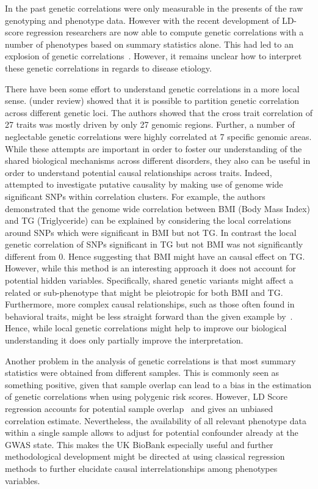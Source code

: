 In the past genetic correlations were only measurable in the presents of the raw genotyping and phenotype data.
However with the recent development of LD-score regression researchers are now able to compute genetic correlations with a number of phenotypes based on summary statistics alone.
This had led to an explosion of genetic correlations~\cite{Bulik-Sullivan2015b,Bulik-Sullivan2015a}.
However, it remains unclear how to interpret these genetic correlations in regards to disease etiology.

There have been some effort to understand genetic correlations in a more local sense.
\citet{Shi2016a} (under review) showed that it is possible to partition genetic correlation across different genetic loci.
The authors showed that the cross trait correlation of 27 traits was mostly driven by only 27 genomic regions. 
Further, a number of neglectable genetic correlations were highly correlated at 7 specific genomic areas.
While these attempts are important in order to foster our understanding of the shared biological mechanisms across different disorders, they also can be useful in order to understand potential causal relationships across traits.
Indeed,~\citet{Shi2016a} attempted to investigate putative causality by making use of genome wide significant SNPs within correlation clusters.
For example, the authors demonstrated that the genome wide correlation between BMI (Body Mass Index) and TG (Triglyceride) can be explained by considering the local correlations around SNPs which were significant in BMI but not TG\@.
In contrast the local genetic correlation of SNPs significant in TG  but not BMI was not significantly different from $0$.
Hence suggesting that BMI might have an causal effect on TG\@.
However, while this method is an interesting approach it does not account for potential hidden variables.
Specifically, shared genetic variants might affect a related or sub-phenotype that might be pleiotropic for both BMI and TG\@.
Furthermore, more complex causal relationships, such as those often found in behavioral traits, might be less straight forward than the given example by~\citet{Shi2016a}.
Hence, while local genetic correlations might help to improve our biological understanding it does only partially improve the interpretation.

Another problem in the analysis of genetic correlations is that most summary statistics were obtained from different samples.
This is commonly seen as something positive, given that sample overlap can lead to a bias in the estimation of genetic correlations when using polygenic risk scores. 
However, LD Score regression accounts for potential sample overlap~\cite{Bulik-Sullivan2015a} and gives an unbiased correlation estimate.  
Nevertheless, the availability of all relevant phenotype data within a single sample allows to adjust for potential confounder already at the GWAS state.
This makes the UK BioBank especially useful and further methodological development might be directed at using classical regression methods to further elucidate causal interrelationships among phenotypes variables.

